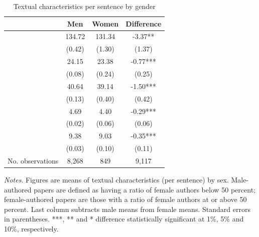 \begin{table}
    \footnotesize
    \centering
    \begin{threeparttable}
        \caption{Textual characteristics per sentence by gender}
        \label{table2}
        \begin{tabular}{p{4cm}S@{}S@{}S@{}}
            \toprule
            &{Men}&{Women}&{Difference}\\
            \midrule
                &      134.72&      131.34&       -3.37** \\
                                          &      {(0.42)}&      {(1.30)}&      {(1.37)}   \\
                     &       24.15&       23.38&       -0.77***\\
                                          &      {(0.08)}&      {(0.24)}&      {(0.25)}   \\
                 &       40.64&       39.14&       -1.50***\\
                                          &      {(0.13)}&      {(0.40)}&      {(0.42)}   \\
            &        4.69&        4.40&       -0.29***\\
                                          &      {(0.02)}&      {(0.06)}&      {(0.06)}   \\
            &        9.38&        9.03&       -0.35***\\
                                          &      {(0.03)}&      {(0.10)}&      {(0.11)}   \\
            \midrule
            No. observations              &       8,268&         849&       9,117   \\
            \bottomrule
        \end{tabular}
        \begin{tablenotes}
            \tiny
            \item \textit{Notes}. Figures are means of textual characteristics (per sentence) by sex. Male-authored papers are defined as having a ratio of female authors below 50 percent; female-authored papers are those with a ratio of female authors at or above 50 percent. Last column subtracts male means from female means. Standard errors in parentheses. ***, ** and * difference statistically significant at 1\%, 5\% and 10\%, respectively.
        \end{tablenotes}
    \end{threeparttable}
\end{table}
